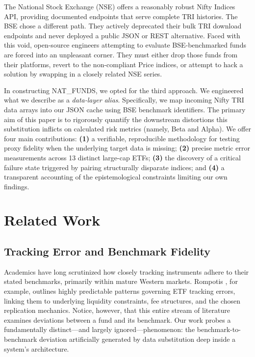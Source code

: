 \documentclass[conference]{IEEEtran}
\begin{document}
The National Stock Exchange (NSE) offers a reasonably robust Nifty Indices API, providing documented endpoints that serve complete TRI histories. The BSE chose a different path. They actively deprecated their bulk TRI download endpoints and never deployed a public JSON or REST alternative. Faced with this void, open-source engineers attempting to evaluate BSE-benchmarked funds are forced into an unpleasant corner. They must either drop those funds from their platforms, revert to the non-compliant Price indices, or attempt to hack a solution by swapping in a closely related NSE series.

In constructing NAT\_FUNDS, we opted for the third approach. We engineered what we describe as a \emph{data-layer alias}. Specifically, we map incoming Nifty TRI data arrays into our JSON cache using BSE benchmark identifiers. The primary aim of this paper is to rigorously quantify the downstream distortions this substitution inflicts on calculated risk metrics (namely, Beta and Alpha). We offer four main contributions: \textbf{(1)} a verifiable, reproducible methodology for testing proxy fidelity when the underlying target data is missing; \textbf{(2)} precise metric error measurements across 13 distinct large-cap ETFs; \textbf{(3)} the discovery of a critical failure state triggered by pairing structurally disparate indices; and \textbf{(4)} a transparent accounting of the epistemological constraints limiting our own findings.

\section{Related Work}

\subsection{Tracking Error and Benchmark Fidelity}
Academics have long scrutinized how closely tracking instruments adhere to their stated benchmarks, primarily within mature Western markets. Rompotis \cite{rompotis2011}, for example, outlines highly predictable patterns governing ETF tracking errors, linking them to underlying liquidity constraints, fee structures, and the chosen replication mechanics. Notice, however, that this entire stream of literature examines deviations between a fund and its benchmark. Our work probes a fundamentally distinct---and largely ignored---phenomenon: the benchmark-to-benchmark deviation artificially generated by data substitution deep inside a system's architecture.
\end{document}
